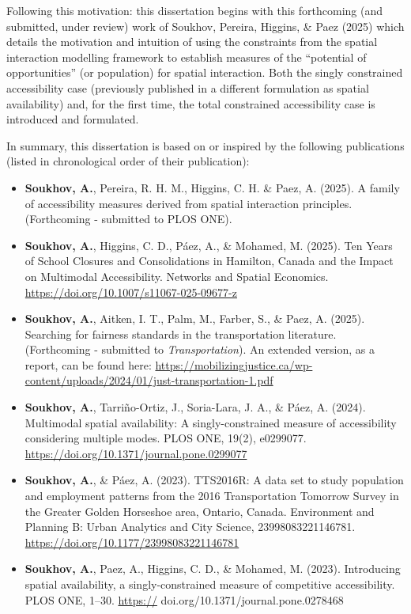 \documentclass[
11pt, %
oneside, %
english, %
singlespacing, %
]{macthesis} %
\def\tightlist{}
\begin{document}
Following this motivation: this dissertation begins with this forthcoming (and submitted, under review) work of Soukhov, Pereira, Higgins, \& Paez (2025) which details the motivation and intuition of using the constraints from the spatial interaction modelling framework to establish measures of the ``potential of opportunities'' (or population) for spatial interaction. Both the singly constrained accessibility case (previously published in a different formulation as spatial availability) and, for the first time, the total constrained accessibility case is introduced and formulated.

In summary, this dissertation is based on or inspired by the following publications (listed in chronological order of their publication):

\begin{itemize}
\tightlist
\item
  \textbf{Soukhov, A.}, Pereira, R. H. M., Higgins, C. H. \& Paez, A. (2025). A family of accessibility measures derived from spatial interaction principles. (Forthcoming - submitted to PLOS ONE).
\item
  \textbf{Soukhov, A.}, Higgins, C. D., Páez, A., \& Mohamed, M. (2025). Ten Years of School Closures and Consolidations in Hamilton, Canada and the Impact on Multimodal Accessibility. Networks and Spatial Economics. \url{https://doi.org/10.1007/s11067-025-09677-z}
\item
  \textbf{Soukhov, A.}, Aitken, I. T., Palm, M., Farber, S., \& Paez, A. (2025). Searching for fairness standards in the transportation literature. (Forthcoming - submitted to \emph{Transportation}). An extended version, as a report, can be found here: \url{https://mobilizingjustice.ca/wp-content/uploads/2024/01/just-transportation-1.pdf}
\item
  \textbf{Soukhov, A.}, Tarriño-Ortiz, J., Soria-Lara, J. A., \& Páez, A. (2024). Multimodal spatial availability: A singly-constrained measure of accessibility considering multiple modes. PLOS ONE, 19(2), e0299077. \url{https://doi.org/10.1371/journal.pone.0299077}
\item
  \textbf{Soukhov, A.}, \& Páez, A. (2023). TTS2016R: A data set to study population and employment patterns from the 2016 Transportation Tomorrow Survey in the Greater Golden Horseshoe area, Ontario, Canada. Environment and Planning B: Urban Analytics and City Science, 23998083221146781. \url{https://doi.org/10.1177/23998083221146781}
\item
  \textbf{Soukhov, A.}, Paez, A., Higgins, C. D., \& Mohamed, M. (2023). Introducing spatial availability, a singly-constrained measure of competitive accessibility. PLOS ONE, 1--30. \url{https://} doi.org/10.1371/journal.pone.0278468
\end{itemize}
\end{document}

